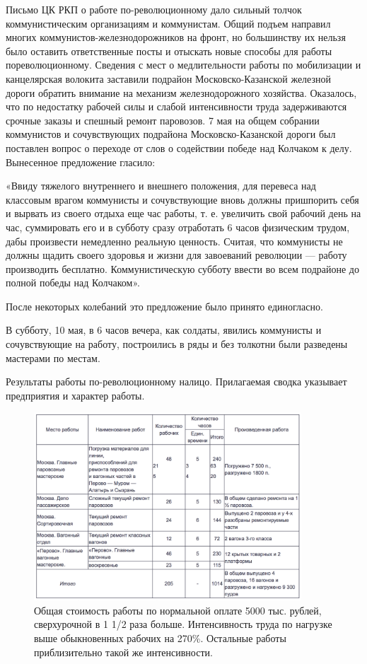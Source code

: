 \documentclass[12pt]{article}
\newcommand{\parnum}{(\arabic{parcount})}
\newcounter{parcount}
\newenvironment{parnumbers}{%
  \par%
  \everypar{\noindent \stepcounter{parcount}\marginpar[]{\parnum}}%
}{}
\begin{document}
\begin{parnumbers}
Письмо ЦК РКП о работе по-революционному дало сильный толчок коммунистическим организациям и коммунистам. Общий подъем направил многих коммунистов-железнодорожников на фронт, но большинству их нельзя было оставить ответственные посты и отыскать новые способы для работы пореволюционному. Сведения с мест о медлительности работы по мобилизации и канцелярская волокита заставили подрайон Московско-Казанской железной дороги обратить внимание на механизм железнодорожного хозяйства. Оказалось, что по недостатку рабочей силы и слабой интенсивности труда задерживаются срочные заказы и спешный ремонт паровозов. 7 мая на общем собрании коммунистов и сочувствующих подрайона Московско-Казанской дороги был поставлен вопрос о переходе от слов о содействии победе над Колчаком к делу. Вынесенное предложение гласило:

«Ввиду тяжелого внутреннего и внешнего положения, для перевеса над классовым врагом коммунисты и сочувствующие вновь должны пришпорить себя и вырвать из своего отдыха еще час работы, т. е. увеличить свой рабочий день на час, суммировать его и в субботу сразу отработать 6 часов физическим трудом, дабы произвести немедленно реальную ценность. Считая, что коммунисты не должны щадить своего здоровья и жизни для завоеваний революции — работу производить бесплатно. Коммунистическую субботу ввести во всем подрайоне до полной победы над Колчаком».

После некоторых колебаний это предложение было принято единогласно.

В субботу, 10 мая, в 6 часов вечера, как солдаты, явились коммунисты и сочувствующие на работу, построились в ряды и без толкотни были разведены мастерами по местам.

Результаты работы по-революционному налицо. Прилагаемая сводка указывает предприятия и характер работы.
\end{parnumbers}

\begin{figure}[h]
  \centering
  \includegraphics[width=10cm]{pictures/fig-1.png}
  \caption{Общая стоимость работы по нормальной оплате 5000 тыс. рублей, сверхурочной в 1 1/2 раза больше. Интенсивность труда по нагрузке выше обыкновенных рабочих на 270\%. Остальные работы приблизительно такой же интенсивности.}
  \label{fig:fig1}
\end{figure}
\end{document}
